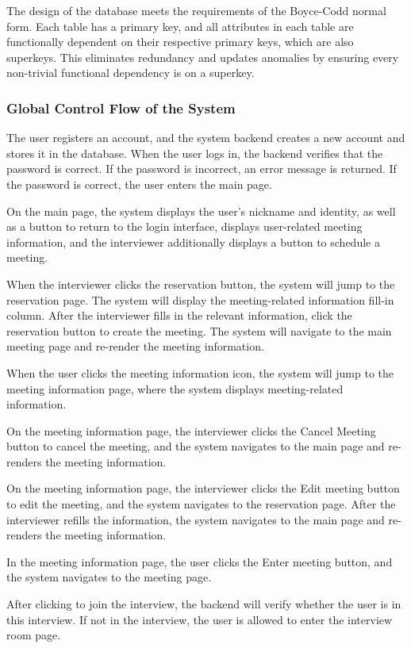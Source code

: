 \documentclass{article}
\begin{document}
The design of the database meets the requirements of the Boyce-Codd normal form. Each table has a primary key, and all attributes in each table are functionally dependent on their respective primary keys, which are also superkeys. This eliminates redundancy and updates anomalies by ensuring every non-trivial functional dependency is on a superkey.

\subsubsection*{Global Control Flow of the System}
The user registers an account, and the system backend creates a new account and stores it in the database. When the user logs in, the backend verifies that the password is correct. If the password is incorrect, an error message is returned. If the password is correct, the user enters the main page.

On the main page, the system displays the user's nickname and identity, as well as a button to return to the login interface, displays user-related meeting information, and the interviewer additionally displays a button to schedule a meeting.

When the interviewer clicks the reservation button, the system will jump to the reservation page. The system will display the meeting-related information fill-in column. After the interviewer fills in the relevant information, click the reservation button to create the meeting. The system will navigate to the main meeting page and re-render the meeting information.

When the user clicks the meeting information icon, the system will jump to the meeting information page, where the system displays meeting-related information.

On the meeting information page, the interviewer clicks the Cancel Meeting button to cancel the meeting, and the system navigates to the main page and re-renders the meeting information.

On the meeting information page, the interviewer clicks the Edit meeting button to edit the meeting, and the system navigates to the reservation page. After the interviewer refills the information, the system navigates to the main page and re-renders the meeting information.

In the meeting information page, the user clicks the Enter meeting button, and the system navigates to the meeting page.

After clicking to join the interview, the backend will verify whether the user is in this interview. If not in the interview, the user is allowed to enter the interview room page.
\end{document}
